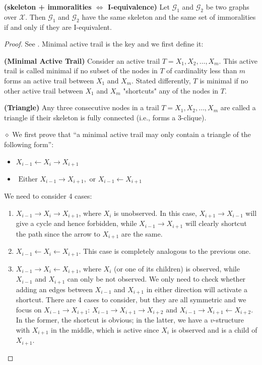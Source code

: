 \documentclass{article}
\newcommand{\bfs}[1]{\textbf{({#1}) }}
\begin{document}
\begin{thma}\bfs{skeleton + immoralities $\Longleftrightarrow$ I-equivalence}
Let $\mathcal{G}_{1}$ and $\mathcal{G}_{2}$ be two graphs over $\mathcal{X} .$ Then $\mathcal{G}_{1}$ and $\mathcal{G}_{2}$ have the same skeleton and the same set of immoralities if and only if they are I-equivalent.
\end{thma}
\begin{proof}
See \cite[P100 ex. 3.17]{koller2009probabilistic}. Minimal active trail is the key and we first define it:

\begin{defa}\bfs{Minimal Active Trail}
Consider an active trail $T=X_{1}, X_{2}, \ldots, X_{m} .$ This active trail is called minimal if no subset of the nodes in $T$ of cardinality less than $m$ forms an active trail between $X_{1}$ and $X_{m} .$ Stated differently, $T$ is minimal if no other active trail between $X_{1}$ and $X_{m}$ "shortcuts" any of the nodes in $T$.
\end{defa}
\begin{defa}\bfs{Triangle}
Any three consecutive nodes in a trail $T=X_{1}, X_{2}, \ldots, X_{m}$ are called a triangle if their skeleton is fully connected (i.e., forms a 3-clique).
\end{defa}
$\diamond$ We first prove that ``a minimal active trail may only contain a triangle of the following form'':
\begin{itemize}[*]
    \item $X_{i-1} \leftarrow X_{i} \rightarrow X_{i+1}$
    \item $\text { Either } X_{i-1} \rightarrow X_{i+1}, \text { or } X_{i-1} \leftarrow X_{i+1}$
\end{itemize}
We need to consider 4 cases:
\begin{enumerate}
    \item $X_{i-1} \rightarrow X_{i} \rightarrow X_{i+1}$, where $X_{i}$ is unobserved. In this case, $X_{i+1} \rightarrow X_{i-1}$ will give a cycle and hence forbidden, while $X_{i-1} \rightarrow X_{i+1}$ will clearly shortcut the path since the arrow to $X_{i+1}$ are the same.
    \item $X_{i-1} \leftarrow X_{i} \leftarrow X_{i+1}$. This case is completely analogous to the previous one.
    \item $X_{i-1} \rightarrow X_{i} \leftarrow X_{i+1}$, where $X_{i}$ (or one of its children) is observed, while $X_{i-1}$ and $X_{i+1}$ can only be not observed. We only need to check whether adding an edges between $X_{i-1}$ and $X_{i+1}$ in either direction will activate a shortcut. There are 4 cases to consider, but they are all symmetric and we focus on $X_{i-1}\rightarrow X_{i+1}$: $X_{i-1} \rightarrow X_{i+1} \rightarrow X_{i+2}$ and $X_{i-1} \rightarrow X_{i+1} \leftarrow X_{i+2} .$ In the former, the shortcut is obvious; in the latter, we have a $v$-structure with $X_{i+1}$ in the middle, which is active since $X_{i}$ is observed and is a child of $X_{i+1}$.

\end{enumerate}
\end{proof}
\end{document}
